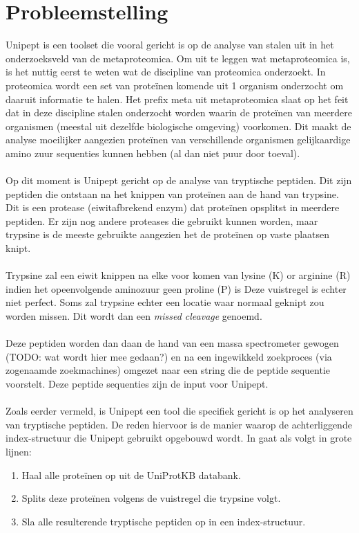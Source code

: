 \documentclass[11pt,dutch,faculty=we,layout=titlefont,underline=false,titleUppercase=true,titleUnderline=true]{ugent2016-report}
\begin{document}
    \section{Probleemstelling}
    Unipept is een toolset die vooral gericht is op de analyse van stalen uit in het onderzoeksveld van de metaproteomica.
    Om uit te leggen wat metaproteomica is, is het nuttig eerst te weten wat de discipline van proteomica onderzoekt.
    In proteomica wordt een set van proteïnen komende uit 1 organism onderzocht om daaruit informatie te halen.
    Het prefix meta uit metaproteomica slaat op het feit dat in deze discipline stalen onderzocht worden waarin de proteïnen van meerdere organismen (meestal uit dezelfde biologische omgeving) voorkomen.
    Dit maakt de analyse moeilijker aangezien proteïnen van verschillende organismen gelijkaardige amino zuur sequenties kunnen hebben (al dan niet puur door toeval).
    \\ \\
    Op dit moment is Unipept gericht op de analyse van tryptische peptiden.
    Dit zijn peptiden die ontstaan na het knippen van proteïnen aan de hand van trypsine.
    Dit is een protease (eiwitafbrekend enzym) dat proteïnen opsplitst in meerdere peptiden.
    Er zijn nog andere proteases die gebruikt kunnen worden, maar trypsine is de meeste gebruikte aangezien het de proteïnen op vaste plaatsen knipt.
    \\ \\
    Trypsine zal een eiwit knippen na elke voor komen van lysine (K) or arginine (R) indien het opeenvolgende aminozuur geen proline (P) is
    Deze vuistregel is echter niet perfect.
    Soms zal trypsine echter een locatie waar normaal geknipt zou worden missen.
    Dit wordt dan een \textit{missed cleavage} genoemd.
    \\ \\
    Deze peptiden worden dan daan de hand van een massa spectrometer gewogen (TODO: wat wordt hier mee gedaan?) en na een ingewikkeld zoekproces (via zogenaamde zoekmachines) omgezet naar een string die de peptide sequentie voorstelt.
    Deze peptide sequenties zijn de input voor Unipept.
    \\ \\
    Zoals eerder vermeld, is Unipept een tool die specifiek gericht is op het analyseren van tryptische peptiden.
    De reden hiervoor is de manier waarop de achterliggende index-structuur die Unipept gebruikt opgebouwd wordt.
    In gaat als volgt in grote lijnen:
    \begin{enumerate}
        \item Haal alle proteïnen op uit de UniProtKB databank.
        \item Splits deze proteïnen volgens de vuistregel die trypsine volgt.
        \item Sla alle resulterende tryptische peptiden op in een index-structuur.
    \end{enumerate}
\end{document}

